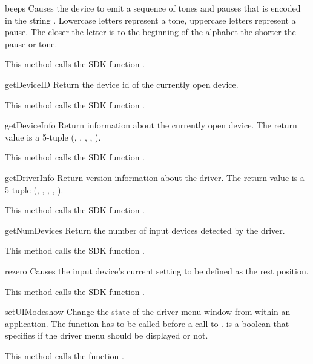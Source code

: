 \begin{methoddesc}{beep}{s}
Causes the device to emit a sequence of tones and pauses that is
encoded in the string . Lowercase letters represent a tone,
uppercase letters represent a pause.  The closer the letter is to the
beginning of the alphabet the shorter the pause or tone.

This method calls the SDK function .
\end{methoddesc}

\begin{methoddesc}{getDeviceID}{}
Return the device id of the currently open device. 

This method calls the SDK function .
\end{methoddesc}

\begin{methoddesc}{getDeviceInfo}{}
Return information about the currently open device. The return value
is a 5-tuple (, , ,
, ). 

This method calls the SDK function .
\end{methoddesc}

\begin{methoddesc}{getDriverInfo}{}
Return version information about the driver. The return value is a 5-tuple
(, , , , ).

This method calls the SDK function .
\end{methoddesc}

\begin{methoddesc}{getNumDevices}{}
Return the number of input devices detected by the driver. 

This method calls the SDK function .
\end{methoddesc}

\begin{methoddesc}{rezero}{}
Causes the input device's current setting to be defined as the rest
position. 

This method calls the SDK function .
\end{methoddesc}

\begin{methoddesc}{setUIMode}{show}
Change the state of the driver menu window from within an application. The
function has to be called before a call to .
 is a boolean that specifies if the driver menu should be displayed
or not.

This method calls the function .
\end{methoddesc}


